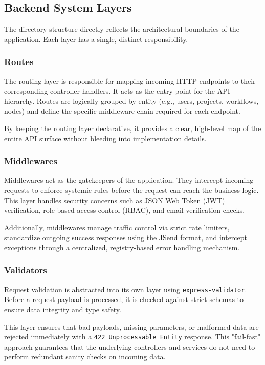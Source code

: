 \subsection{Backend System Layers}

The directory structure directly reflects the architectural boundaries of the application. Each layer has a single, distinct responsibility.

\subsubsection{Routes}
The routing layer is responsible for mapping incoming HTTP endpoints to their corresponding controller handlers. It acts as the entry point for the API hierarchy. Routes are logically grouped by entity (e.g., users, projects, workflows, nodes) and define the specific middleware chain required for each endpoint. 

By keeping the routing layer declarative, it provides a clear, high-level map of the entire API surface without bleeding into implementation details.

\subsubsection{Middlewares}
Middlewares act as the gatekeepers of the application. They intercept incoming requests to enforce systemic rules before the request can reach the business logic. This layer handles security concerns such as JSON Web Token (JWT) verification, role-based access control (RBAC), and email verification checks.

Additionally, middlewares manage traffic control via strict rate limiters, standardize outgoing success responses using the JSend format, and intercept exceptions through a centralized, registry-based error handling mechanism.

\subsubsection{Validators}
Request validation is abstracted into its own layer using \texttt{express-validator}. Before a request payload is processed, it is checked against strict schemas to ensure data integrity and type safety.

This layer ensures that bad payloads, missing parameters, or malformed data are rejected immediately with a \texttt{422 Unprocessable Entity} response. This "fail-fast" approach guarantees that the underlying controllers and services do not need to perform redundant sanity checks on incoming data.


